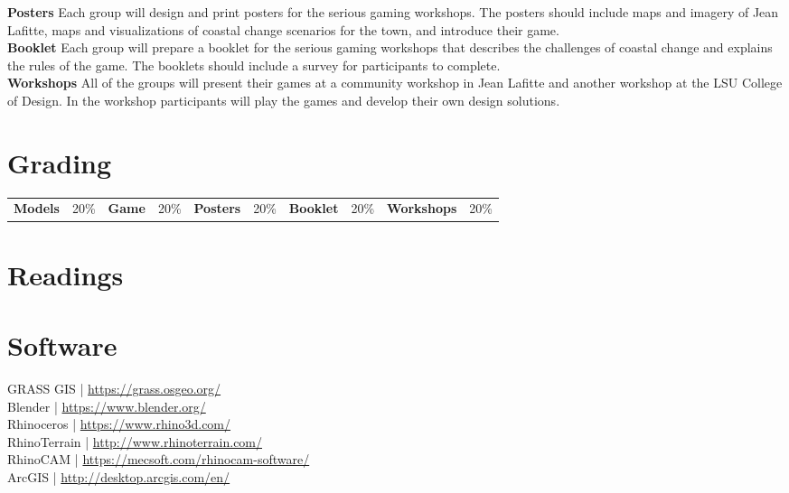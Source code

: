 \documentclass[11pt,article,oneside]{memoir}
\begin{document}
\noindent \textbf{Posters}
Each group will design and print posters
for the serious gaming workshops. 
The posters should 
include maps and imagery of Jean Lafitte,
maps and visualizations of 
coastal change scenarios for the town,
and introduce their game.
\\

\noindent \textbf{Booklet}
Each group will prepare a booklet for the serious gaming workshops
that describes the challenges of coastal change 
and explains the rules of the game.
The booklets should include a survey 
for participants to complete.
\\

\noindent \textbf{Workshops}
All of the groups will present their games at 
a community workshop in Jean Lafitte
and another workshop at the LSU College of Design. 
In the workshop participants will play the games
and develop their own design solutions.
\\

\section{Grading}

\begin{table}[H]
\small
\begin{tabular}{l l l l l l l l l l}
\textbf{Models} & 20\% &
\textbf{Game} & 20\% &
\textbf{Posters} & 20\% &
\textbf{Booklet} & 20\% &
\textbf{Workshops} & 20\% \\
\end{tabular}
\end{table}

\section{Readings}
\renewcommand*{\bibfont}{\normalsize} %
\vspace*{0.5cm}
\nocite{*}
\setlength{}
\printbibliography[heading=none]

\clearpage

\section{Software}
GRASS GIS | \url{https://grass.osgeo.org/}\\
Blender | \url{https://www.blender.org/}\\
Rhinoceros | \url{https://www.rhino3d.com/}\\
RhinoTerrain | \url{http://www.rhinoterrain.com/}\\
RhinoCAM | \url{https://mecsoft.com/rhinocam-software/}\\
ArcGIS | \url{http://desktop.arcgis.com/en/}\\
\end{document}
